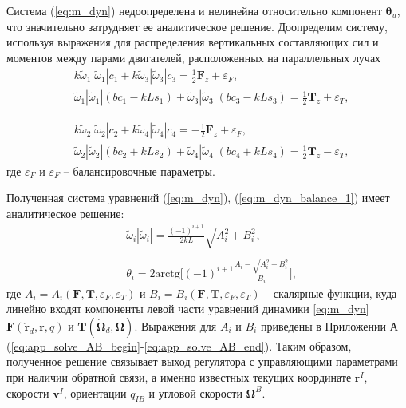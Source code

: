 Система (\ref{eq:m_dyn}) недоопределена и нелинейна относительно компонент $\bm \theta_u$, что значительно затрудняет ее аналитическое решение. Доопределим систему, используя выражения для распределения вертикальных составляющих сил и моментов между парами двигателей, расположенных на параллельных лучах
\begin{equation} \label{eq:m_dyn_balance_1}
\begin{aligned}
&k \tilde\omega_1 |\tilde\omega_1| c_1 + k \tilde\omega_3 |\tilde\omega_3| c_3 =
\frac{1}{2} \bm F_z + \varepsilon_F,
\\
&\tilde\omega_1 |\tilde\omega_1| (bc_1 - kLs_1)
+ \tilde\omega_3 |\tilde\omega_3| (bc_3 - kLs_3) =
\frac{1}{2} \bm T_z + \varepsilon_T,
\end{aligned}
\end{equation}


\begin{equation} \label{eq:m_dyn_balance_2}
\begin{aligned}
&k \tilde\omega_2 |\tilde\omega_2| c_2 + k \tilde\omega_4 |\tilde\omega_4| c_4 =
-\frac{1}{2} \bm F_z + \varepsilon_F,
\\
&\tilde\omega_2 |\tilde\omega_2| (bc_2 + kLs_2)
+ \tilde\omega_4 |\tilde\omega_4| (bc_4 + kLs_4) =
\frac{1}{2} \bm T_z - \varepsilon_T,
\end{aligned}
\end{equation}
где $\varepsilon_F$ и $\varepsilon_F$ -- балансировочные параметры.

Полученная система уравнений (\ref{eq:m_dyn}), (\ref{eq:m_dyn_balance_1}) имеет аналитическое решение:
\begin{equation} \label{eq:m_dyn_resolve}
\begin{aligned}
&\tilde\omega_i |\tilde\omega_i| =
\frac{(-1)^{i+1}}{2kL}\sqrt{
A^2_i + 
B^2_i},
\\
\phantom{}
\\
&\theta_i = 
2 \text{arctg} \Bigg[(-1)^{i+1}	
\frac{A_i -
\sqrt{A^2_i +
B^2_i
}}
{B_i}
\Bigg],
\end{aligned}
\end{equation}
где $A_i = A_i(\bm F, \bm T, \varepsilon_F, \varepsilon_T)$
и
$B_i = B_i(\bm F, \bm T, \varepsilon_F, \varepsilon_T)$
-- скалярные функции, куда линейно входят компоненты левой части уравнений динамики \eqref{eq:m_dyn}
$\bm F(\ddot{\bm r}_d, \dot{\bm r}, q)$
и
$\bm T(\dot{\bm \Omega}_d, \bm\Omega)$.
Выражения для $A_i$ и $B_i$ приведены в Приложении А
(\ref{eq:app_solve_AB_begin}-\ref{eq:app_solve_AB_end}).
Таким образом, полученное решение связывает выход регулятора с управляющими параметрами при наличии обратной связи, а именно известных текущих координате $\bm r^I$, скорости $\bm v^I$, ориентации $q_{IB}$ и угловой скорости $\bm \Omega^B$.

